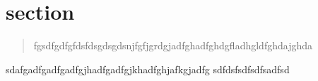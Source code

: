 \newcommand{\institut}{Institut f\"ur Telekommunikationssysteme}
\newcommand{\fachgebiet}{Nachrichten\"ubertragung}
\newcommand{\veranstaltung}{Praktikum Nachrichten\"ubertragung}
\newcommand{\pdfautor}{Dirk Babendererde (321 836), Thomas Kapa (325 219)}
\newcommand{\autor}{Dirk Babendererde (321 836)\\ Thomas Kapa (325 219)}
\newcommand{\gruppe}{Gruppe:}
\newcommand{\betreuer}{Betreuer: Lieven Lange}


\newcommand{\pdftitle}{Nachrichtenuebertragung\ Praktikum\ 05}
\newcommand{\prototitle}{Praktikum 05 \\ Pulsamplitudenmodulation und nichtideale Abtastung}





\section{section}
\begin{quote}
    fgsdfgdfgfdsfdsgdsgdsnjfgfjgrdgjadfghadfghdgfladhgldfghdajghda
\end{quote}


sdafgadfgadfgadfgjhadfgadfgjkhadfghjafkgjadfg
sdfdsfsdfsdfsadfsd
